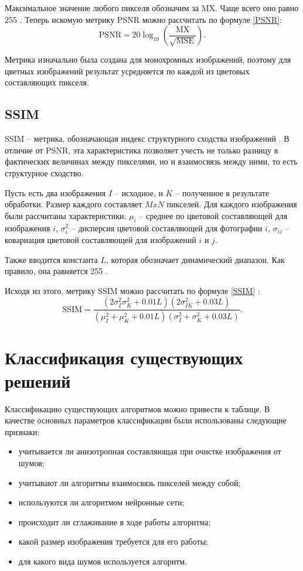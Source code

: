 Максимальное значение любого пикселя обозначим за MX. 
Чаще всего оно равно 255 \cite{rs}.
Теперь искомую метрику PSNR можно рассчитать по формуле \eqref{PSNR}:
\begin{equation}
	\label{PSNR}
 	\mathrm{PSNR} = 20\log_{10}\left(\frac{\mathrm{MX}}{\sqrt{\mathrm{MSE}}}\right).
\end{equation}

Метрика изначально была создана для монохромных изображений, поэтому для цветных изображений результат усредняется по каждой из цветовых составляющих пикселя.
 
\subsection{SSIM}
SSIM -- метрика, обозначающая индекс структурного сходства изображений \cite{ssim}. 
В отличие от PSNR, эта характеристика позволяет учесть не только разницу в фактических величинах между пикселями, но и взаимосвязь между ними, то есть структурное сходство.

Пусть есть два изображения $I$ -- исходное, и $K$ -- полученное в результате обработки.
Размер каждого составляет $MxN$ пикселей. 
Для каждого изображения были рассчитаны характеристики: $\mu_{i}$ -- среднее по цветовой составляющей для изображения $i$, $\sigma^2_i$ -- дисперсия цветовой составляющей для фотографии $i$, $\sigma_{ij}$ -- ковариация цветовой составляющей для изображений $i$ и $j$. 

Также вводится константа $L$, которая обозначает динамический диапазон. 
Как правило, она равняется 255 \cite{ssim}. 

Исходя из этого, метрику SSIM можно рассчитать по формуле \eqref{SSIM} \cite{ssim}:
\begin{equation}
	\label{SSIM}
	\mathrm{SSIM} = \frac{(2\sigma^2_{I}\sigma^2_{K} + 0.01L)(2\sigma^2_{IK} + 0.03L)} { (\mu^2_{I}+\mu^2_{K} +0.01L)  (\sigma^2_{I} +\sigma^2_{K} +0.03L) }.
\end{equation}

\newpage
\section{Классификация существующих решений}
Классификацию существующих алгоритмов можно привести к таблице.
В качестве основных параметров классификации были использованы следующие признаки:
\begin{itemize}
	\item учитывается ли анизотропная составляющая при очистке изображения от шумов;
	\item учитывают ли алгоритмы взаимосвязь пикселей между собой;
	\item используются ли алгоритмом нейронные сети;
	\item происходит ли сглаживание в ходе работы алгоритма;
	\item какой размер изображения требуется для его работы;
	\item для какого вида шумов используется алгоритм.
\end{itemize}

